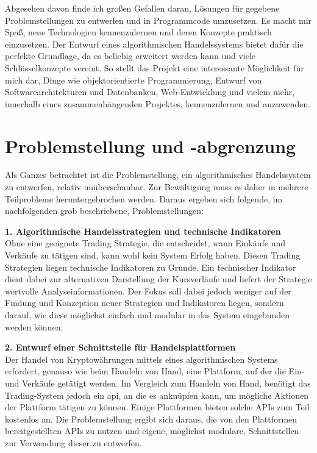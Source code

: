 \documentclass[oneside]{ausarbeitung}
\begin{document}
Abgesehen davon finde ich großen Gefallen daran, Lösungen für
gegebene Problemstellungen zu entwerfen und in Programmcode
umzusetzen. Es macht mir Spaß, neue Technologien kennenzulernen und
deren Konzepte praktisch einzusetzen. Der Entwurf eines
algorithmischen Handelssystems bietet dafür die perfekte Grundlage,
da es beliebig erweitert werden kann und viele Schlüsselkonzepte
vereint. So stellt das Projekt eine interessante Möglichkeit für
mich dar, Dinge wie objektorientierte Programmierung, Entwurf von
Softwarearchitekturen und Datenbanken, Web-Entwicklung und vielem
mehr, innerhalb eines zusammenhängenden Projektes, kennenzulernen und
anzuwenden.


\section{Problemstellung und -abgrenzung}
\label{sec:problemstellung}

Als Ganzes betrachtet ist die Problemstellung, ein algorithmisches
Handelssystem zu entwerfen, relativ unüberschaubar. Zur Bewältigung
muss es daher in mehrere Teilprobleme heruntergebrochen werden. Daraus
ergeben sich folgende, im nachfolgenden grob beschriebene,
Problemstellungen:

\textbf{1. Algorithmische Handelsstrategien und technische Indikatoren} \\
Ohne eine geeignete Trading Strategie, die entscheidet, wann Einkäufe
und Verkäufe zu tätigen sind, kann wohl kein System Erfolg haben.
Diesen Trading Strategien liegen technische Indikatoren zu Grunde. Ein
technischer Indikator dient dabei zur alternativen Darstellung der
Kursverläufe und liefert der Strategie wertvolle Analyseinformationen.
Der Fokus soll dabei jedoch weniger auf der Findung und Konzeption
neuer Strategien und Indikatoren liegen, sondern darauf, wie diese
möglichst einfach und modular in das System eingebunden werden
können.

\textbf{2. Entwurf einer Schnittstelle für Handelsplattformen} \\
Der Handel von Kryptowährungen mittels eines algorithmischen Systems
erfordert, genauso wie beim Handeln von Hand, eine Plattform, auf der
die Ein- und Verkäufe getätigt werden. Im Vergleich zum Handeln von
Hand, benötigt das Trading-System jedoch ein \ac{api}, an die es
anknüpfen kann, um mögliche Aktionen der Plattform tätigen zu
können. Einige Plattformen bieten solche APIs zum Teil kostenlos an.
Die Problemstellung ergibt sich daraus, die von den Plattformen
bereitgestellten APIs zu nutzen und eigene, möglichst modulare,
Schnittstellen zur Verwendung dieser zu entwerfen.
\end{document}
